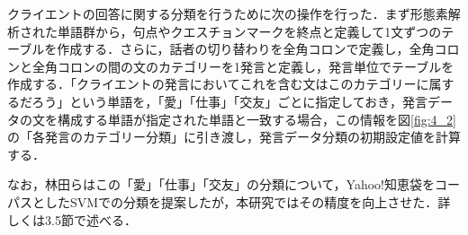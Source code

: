 \documentclass[shuuron]{kuee}
\begin{document}






クライエントの回答に関する分類を行うために次の操作を行った．まず形態素解析された単語群から，句点やクエスチョンマークを終点と定義して1文ずつのテーブルを作成する．さらに，話者の切り替わりを全角コロンで定義し，全角コロンと全角コロンの間の文のカテゴリーを1発言と定義し，発言単位でテーブルを作成する．「クライエントの発言においてこれを含む文はこのカテゴリーに属するだろう」という単語を，「愛」「仕事」「交友」ごとに指定しておき，発言データの文を構成する単語が指定された単語と一致する場合，この情報を図\ref{fig:4_2}の「各発言のカテゴリー分類」に引き渡し，発言データ分類の初期設定値を計算する．

なお，林田ら\cite{hayashidaEn}はこの「愛」「仕事」「交友」の分類について，Yahoo!知恵袋をコーパスとしたSVMでの分類を提案したが，本研究ではその精度を向上させた．詳しくは3.5節で述べる．
\end{document}
